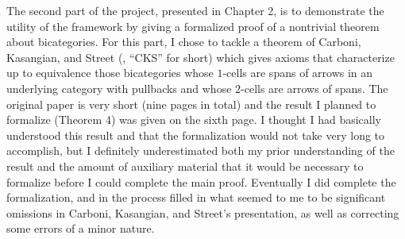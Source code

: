 \documentclass[11pt,notitlepage,a4paper]{report}
\begin{document}
The second part of the project, presented in Chapter 2, is to demonstrate the utility of
the framework by giving a formalized proof of a nontrivial theorem about bicategories.
For this part, I chose to tackle a theorem of Carboni, Kasangian, and Street
(\cite{carboni-et-al}, ``CKS'' for short)
which gives axioms that characterize up to equivalence those bicategories whose $1$-cells are
spans of arrows in an underlying category with pullbacks and whose $2$-cells are arrows
of spans.  The original paper is very short (nine pages in total) and the result I planned to
formalize (Theorem 4) was given on the sixth page.  I thought I had basically understood this result
and that the formalization would not take very long to accomplish, but I definitely
underestimated both my prior understanding of the result and the amount of auxiliary material
that it would be necessary to formalize before I could complete the main proof.
Eventually I did complete the formalization, and in the process filled in what seemed to me
to be significant omissions in Carboni, Kasangian, and Street's presentation, as well as
correcting some errors of a minor nature.
\end{document}
